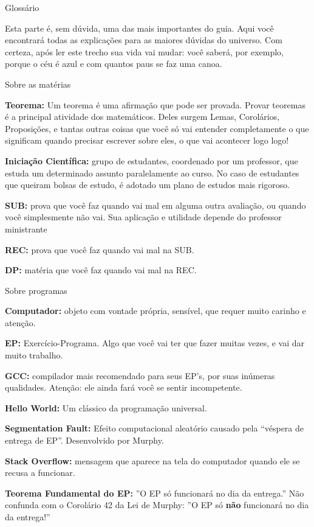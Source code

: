 \begin{secao}{Glossário}

Esta parte é, sem dúvida, uma das mais importantes do guia. Aqui você
encontrará todas as explicações para as maiores dúvidas do universo. Com
certeza, após ler este trecho sua vida vai mudar: você saberá, por exemplo,
porque o céu é azul e com quantos paus se faz uma canoa.

\begin{subsecao}{Sobre as matérias}

{\bf Teorema:} Um teorema é uma afirmação que pode ser provada. Provar
teoremas é a principal atividade dos matemáticos. Deles surgem Lemas,
Corolários, Proposições, e tantas outras coisas que você só vai entender
completamente o que significam quando precisar escrever sobre eles, o que vai
acontecer logo logo!

{\bf Iniciação Científica:} grupo de estudantes, coordenado por um professor, que
estuda um determinado assunto paralelamente ao curso. No caso de estudantes que
queiram bolsas de estudo, é adotado um plano de estudos mais rigoroso.

{\bf SUB:} prova que você faz quando vai mal em alguma outra avaliação, ou
quando você simplesmente não vai. Sua aplicação e utilidade depende do
professor ministrante

{\bf REC:} prova que você faz quando vai mal na SUB.

{\bf DP:} matéria que você faz quando vai mal na REC.
\end{subsecao}

\begin{subsecao}{Sobre programas}

{\bf Computador:} objeto com vontade própria, sensível, que requer muito
carinho e atenção.

{\bf EP:} Exercício-Programa. Algo que você vai ter que fazer muitas vezes, e
vai dar muito trabalho.

{\bf GCC:} compilador mais recomendado para seus EP's, por suas inúmeras
qualidades. Atenção: ele ainda fará você se sentir incompetente.

{\bf Hello World:} Um clássico da programação universal.

{\bf Segmentation Fault:} Efeito computacional aleatório causado pela ``véspera
de entrega de EP''. Desenvolvido por Murphy.

{\bf Stack Overflow:} mensagem que aparece na tela do computador
quando ele se recusa a funcionar.

{\bf Teorema Fundamental do EP:} ''O EP só funcionará no dia da entrega.'' Não
confunda com o Corolário 42 da Lei de Murphy: ''O EP só {\bf não} funcionará no
dia da entrega!''


\end{subsecao}
\end{secao}
